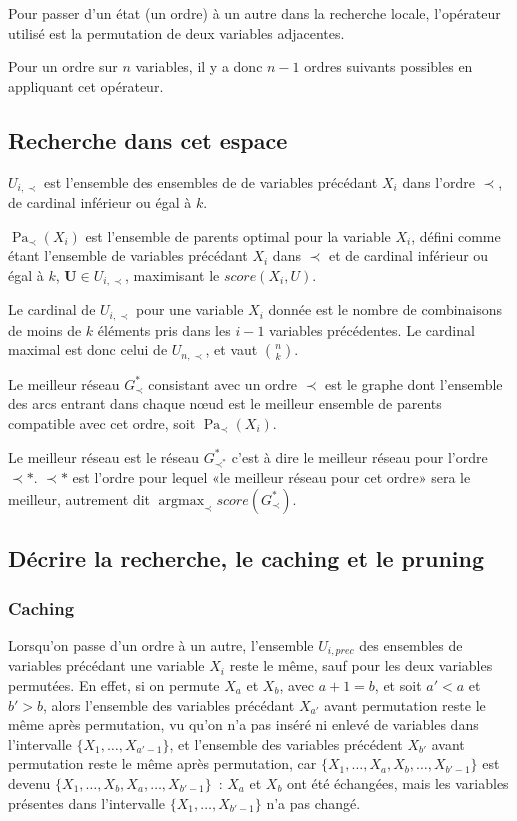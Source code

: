 \documentclass[french,a4paper]{article}
\DeclareMathOperator{\Pa}{Pa}
\DeclareMathOperator{\argmax}{argmax}
\begin{document}
Pour passer d'un état (un ordre) à un autre dans la recherche locale,
l'opérateur utilisé est la permutation de deux variables adjacentes.

Pour un ordre sur $n$ variables, il y a donc $n-1$ ordres suivants
possibles en appliquant cet opérateur.

\subsection{Recherche dans cet espace}

$U_{i,\prec}$ est l'ensemble des ensembles de de variables précédant
$X_i$ dans l'ordre $\prec$, de cardinal inférieur ou égal à $k$.

$\Pa_\prec(X_i)$ est l'ensemble de parents optimal pour la variable
$X_i$, défini comme étant l'ensemble de variables précédant $X_i$ dans
$\prec$ et de cardinal inférieur ou égal à $k$, $\mathbf{U} \in
U_{i,\prec}$, maximisant le $score(X_i, U)$.

Le cardinal de $U_{i,\prec}$ pour une variable $X_i$ donnée est le
nombre de combinaisons de moins de $k$ éléments pris dans les $i-1$
variables précédentes. Le cardinal maximal est donc celui de
$U_{n,\prec}$, et vaut $\binom{n}{k}$.

Le meilleur réseau $G^*_\prec$ consistant avec un ordre $\prec$ est le
graphe dont l'ensemble des arcs entrant dans chaque nœud est le
meilleur ensemble de parents compatible avec cet ordre, soit
$\Pa_\prec(X_i)$.

Le meilleur réseau est le réseau $G^*_{\prec^*}$ c'est à dire le
meilleur réseau pour l'ordre $\prec*$. $\prec*$ est l'ordre pour
lequel «le meilleur réseau pour cet ordre» sera le meilleur, autrement
dit $\argmax_{\prec} score(G^*_\prec)$.

\subsection{Décrire la recherche, le caching et le pruning}

\subsubsection{Caching}

Lorsqu'on passe d'un ordre à un autre, l'ensemble $U_{i,prec}$ des
ensembles de variables précédant une variable $X_i$ reste le même,
sauf pour les deux variables permutées. En effet, si on permute $X_a$
et $X_b$, avec $a + 1 = b$, et soit $a' < a$ et $b' > b$, alors
l'ensemble des variables précédant $X_{a'}$ avant permutation reste le
même après permutation, vu qu'on n'a pas inséré ni enlevé de variables
dans l'intervalle $\{X_1, \dots, X_{a'-1}\}$, et l'ensemble des
variables précédent $X_{b'}$ avant permutation reste le même après
permutation, car $\{X_1, \dots, X_{a}, X_{b}, \dots, X_{b'-1}\}$ est
devenu $\{X_1, \dots, X_{b}, X_{a}, \dots, X_{b'-1}\}$~: $X_a$ et
$X_b$ ont été échangées, mais les variables présentes dans
l'intervalle $\{X_1, \dots, X_{b'-1}\}$ n'a pas changé.
\end{document}
